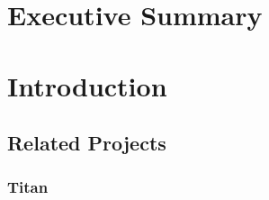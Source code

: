 \documentclass[pdf,12pt,report,strict]{SANDreport}
\newcommand{\titan}{Titan}
\begin{document}


\cleardoublepage		%
\chapter*{Executive Summary}




% 
\SANDmain		%

\chapter{Introduction}
\label{chap:Introduction}

\section{Related Projects}
\label{sec:RelatedProjects}

\subsection{\titan}
\label{sec:RelatedProjects:Titan}
\end{document}
